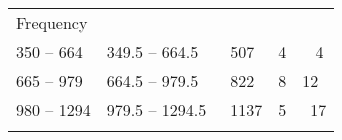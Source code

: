 \documentclass[]{book}
\begin{document}
\begin{longtable}[]{@{}lllll@{}}
\begin{minipage}[t]{0.17\columnwidth}
Frequency\strut
\end{minipage}\tabularnewline
\begin{minipage}[t]{0.18\columnwidth}\raggedright
350 -- 664\strut
\end{minipage} & \begin{minipage}[t]{0.23\columnwidth}\raggedright
349.5 -- 664.5\strut
\end{minipage} & \begin{minipage}[t]{0.13\columnwidth}\raggedright
~507\strut
\end{minipage} & \begin{minipage}[t]{0.14\columnwidth}\raggedright
4\strut
\end{minipage} & \begin{minipage}[t]{0.17\columnwidth}\raggedright
~ 4\strut
\end{minipage}\tabularnewline
\begin{minipage}[t]{0.18\columnwidth}\raggedright
665 -- 979\strut
\end{minipage} & \begin{minipage}[t]{0.23\columnwidth}\raggedright
664.5 -- 979.5\strut
\end{minipage} & \begin{minipage}[t]{0.13\columnwidth}\raggedright
~822\strut
\end{minipage} & \begin{minipage}[t]{0.14\columnwidth}\raggedright
8\strut
\end{minipage} & \begin{minipage}[t]{0.17\columnwidth}\raggedright
12\strut
\end{minipage}\tabularnewline
\begin{minipage}[t]{0.18\columnwidth}\raggedright
980 -- 1294\strut
\end{minipage} & \begin{minipage}[t]{0.23\columnwidth}\raggedright
979.5 -- 1294.5\strut
\end{minipage} & \begin{minipage}[t]{0.13\columnwidth}\raggedright
~1137\strut
\end{minipage} & \begin{minipage}[t]{0.14\columnwidth}\raggedright
5\strut
\end{minipage} & \begin{minipage}[t]{0.17\columnwidth}\raggedright
~17\strut
\end{minipage}\tabularnewline
\begin{minipage}[t]{0.18\columnwidth}\raggedright

\end{minipage}
\end{longtable}
\end{document}
